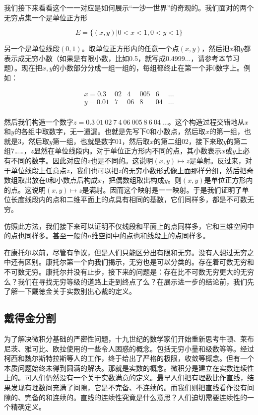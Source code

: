 \documentclass{article}
\begin{document}
我们接下来看看这个一一对应是如何展示“一沙一世界”的奇观的。我们面对的两个无穷点集一个是单位正方形

\[
E = \{ (x, y) | 0 < x < 1, 0 < y < 1\}
\]

另一个是单位线段$(0, 1)$。取单位正方形内的任意一个点$(x, y)$，然后把$x$和$y$都表示成无穷小数（如果是有限小数，比如0.5，就写成0.4999...，请参考本节习题）。现在把$x, y$的小数部分分成一组一组的，每组都终止在第一个非0数字上。例如：

\[
\begin{array}{lcccccc}
x = 0.3 & 02 & 4 & 005 & 6 & ... \\
y = 0.01 & 7 & 06 & 8 & 04 & ... \\
\end{array}
\]

然后我们构造一个数字$ z = 0.3\ 01\ 02\ 7\ 4\ 06\ 005\ 8\ 6\ 04\ ...$。这个构造过程交错地从$x$和$y$的各组中取数字，无一遗漏。也就是先写下0和小数点，然后取$x$的第一组，也就是3，然后取$y$第一组，也就是数字01，然后取$x$的第二组02，接下来取$y$的第二组7……，$z$显然在单位线段内。对于单位正方形内不同的点，其小数表示$x$或$y$上必有不同的数字。因此对应的$z$也是不同的。这说明$(x, y) \mapsto z$是单射。反过来，对于单位线段上任意点$z$，我们也可以把$z$的无穷小数形式像上面那样分组，然后把奇数组取出放在0和小数点后构成$x$，把偶数组取出构成$y$。则$(x, y)$是单位正方形内的点。这说明$(x, y) \mapsto z$是满射。因而这个映射是一一映射。于是我们证明了单位长度线段内的点和二维平面上的点具有相同的基数，它们同样多，都是不可数无穷。

仿照此方法，我们接下来可以证明不仅线段和平面上的点同样多，它和三维空间中的点也同样多。甚至一般的$n$维空间中的点也和线段上的点同样多。

在康托尔以前，尽管有争议，但是人们只能区分出有限和无穷。没有人想过无穷之中还有区别。康托尔第一个向我们揭示，无穷也是可以分类的。存在着可数无穷和不可数无穷。康托尔并没有止步，接下来的问题是：存在比不可数无穷更大的无穷么？我们在寻找无穷等级的道路上走到终点了么？在展示进一步的结论前，我们先了解一下戴徳金关于实数别出心裁的定义。

\begin{Exercise}
\end{Exercise}

\subsection{戴得金分割}
为了解决微积分基础的严密性问题，十九世纪的数学家们开始重新思考牛顿、莱布尼茨、雅可比、欧拉使用的一些令人困惑的概念。包括无穷小量和级数等等。经过柯西和魏尔斯特拉斯等人的工作，终于给出了严格的极限，收敛等概念。但有一个本质问题始终未得到圆满的解决。那就是实数的概念。微积分是建立在实数连续性上的。可人们仍然没有一个关于实数满意的定义。最早人们把有理数比作直线，结果发现有理数间充满了间隙，它是不完备、不连续的。而我们则把直线看作没有间隙的、完备的和连续的。直线的连续性究竟是什么意思？人们迫切需要连续性的一个精确定义。
\end{document}
